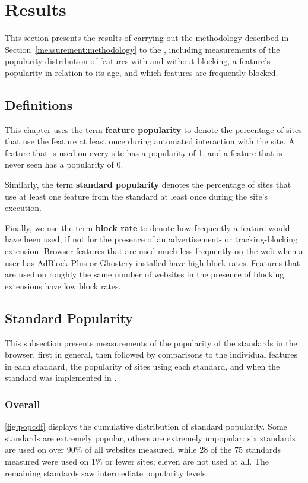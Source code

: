 \section{Results}
\label{measurement:results}

This section presents the results of carrying out the methodology described in
Section~\ref{measurement:methodology} to the \ATK, including measurements
of the popularity distribution of \JS features with and without blocking, a
feature's popularity in relation to its age, and which features are frequently
blocked.


\subsection{Definitions}
This chapter uses the term \textbf{feature popularity} to
denote the percentage of sites that use the feature at least once during
automated interaction with the site.  A feature that is used on every site has
a popularity of 1, and a feature that is never seen has a popularity of 0.

Similarly, the term \textbf{standard popularity} denotes the
percentage of sites that use at least one feature from the standard at least
once during the site's execution.

Finally, we use the term \textbf{block rate} to denote how frequently a feature
would have been used, if not for the presence of an advertisement- or
tracking-blocking extension. Browser features that are used much less
frequently on the web when a user has AdBlock Plus or Ghostery installed have
high block rates. Features that are used on roughly the same number of
websites in the presence of blocking extensions have low block rates.


\subsection{Standard Popularity}
This subsection presents measurements of the popularity of the standards in the
browser, first in general, then followed by comparisons to the individual
features in each standard, the popularity of sites using each standard, and
when the standard was implemented in \FF.


\subsubsection{Overall}

\ref{fig:popcdf} displays the cumulative distribution of standard
popularity. Some standards are extremely popular, others are extremely
unpopular: six standards are used on over 90\% of all websites measured, while
28 of the 75 standards measured were used on 1\% or fewer sites;
eleven are not used at all. The remaining standards saw intermediate
popularity levels.


